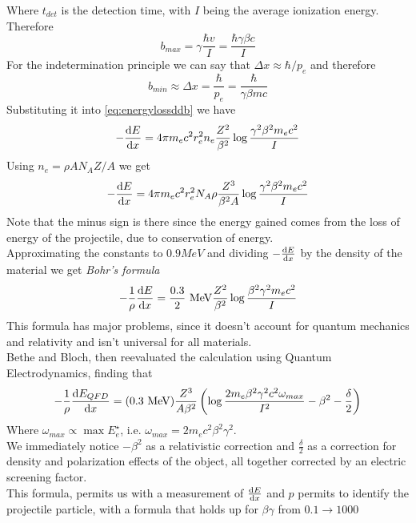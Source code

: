 \documentclass[../qm.tex]{subfiles}
\begin{document}
Where $t_{det}$ is the detection time, with $I$ being the average ionization energy.\\
Therefore
\begin{equation*}
	b_{max}=\gamma\frac{\hbar v}{I}=\frac{\hbar\gamma\beta c}{I}
\end{equation*}
For the indetermination principle we can say that $\Delta x\approx\hbar/p_e$ and therefore
\begin{equation*}
	b_{min}\approx\Delta x=\frac{\hbar}{p_e}=\frac{\hbar}{\gamma\beta mc}
\end{equation*}
Substituting it into \eqref{eq:energylossddb} we have
\begin{equation*}
	-\dv{E}{x}=4\pi m_ec^2r_e^2n_e\frac{Z^2}{\beta^2}\log\frac{\gamma^2\beta^2m_ec^2}{I}
\end{equation*}
Using $n_e=\rho AN_AZ/A$ we get
\begin{equation}
	-\dv{E}{x}=4\pi m_ec^2r_e^2N_A\rho\frac{Z^3}{\beta^2A}\log\frac{\gamma^2\beta^2m_ec^2}{I}
	\label{eq:energylosscomplete}
\end{equation}
Note that the minus sign is there since the energy gained comes from the loss of energy of the projectile, due to conservation of energy.\\
Approximating the constants to $0.9\unit{MeV}$ and dividing $-\dv{E}{x}$ by the density of the material we get \emph{Bohr's formula}
\begin{equation}
	-\frac{1}{\rho}\dv{E}{x}=\frac{0.3}{2}\ \mathrm{MeV}\frac{Z^2}{\beta^2}\log\frac{\beta^2\gamma^2m_ec^2}{I}
	\label{eq:bohrformula}
\end{equation}
This formula has major problems, since it doesn't account for quantum mechanics and relativity and isn't universal for all materials.\\
Bethe and Bloch, then reevaluated the calculation using Quantum Electrodynamics, finding that
\begin{equation}
	-\frac{1}{\rho}\dv{E_{QFD}}{x}=(0.3\ \mathrm{MeV})\frac{Z^3}{A\beta^2}\left( \log\frac{2m_e\beta^2\gamma^2c^2\omega_{max}}{I^2}-\beta^2-\frac{\delta}{2} \right)
	\label{eq:betheblock}
\end{equation}
Where $\omega_{max}\propto\max{E_e^{\star}}$, i.e. $\omega_{max}=2m_ec^2\beta^2\gamma^2$.\\
We immediately notice $-\beta^2$ as a relativistic correction and $\frac{\delta}{2}$ as a correction for density and polarization effects of the object, all together corrected by an electric screening factor.\\ %
This formula, permits us with a measurement of $\dv{E}{x}$ and $p$ permits to identify the projectile particle, with a formula that holds up for $\beta\gamma$ from $0.1\to1000$
\end{document}
